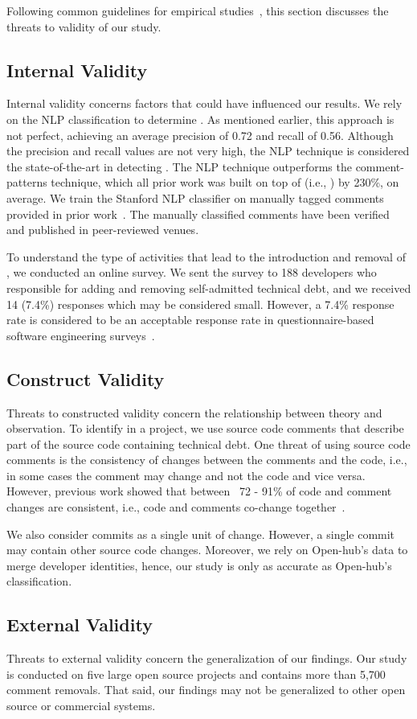 Following common guidelines for empirical studies~\cite{yin2013case},  this section discusses the threats to validity of our study.

\subsection{Internal Validity} Internal validity concerns factors that could
have influenced our results. We rely on the NLP classification to determine \SATD. As mentioned earlier, this approach is not perfect, achieving an average precision of 0.72 and recall of 0.56. Although the precision and recall values are not very high, the NLP technique is considered the state-of-the-art in detecting \SATD. The NLP technique outperforms the comment-patterns technique, which all prior work was built on top of (i.e., \cite{Wehaibi2016SANER,Bavota2016MSR,Potdar2014ICSME}) by 230\%, on average. We train the Stanford NLP classifier on manually tagged \SATD comments provided in prior work~\cite{Maldonado2015TSE}. The manually classified comments have been verified and published in peer-reviewed venues.

To understand the type of activities that lead to the introduction and removal of \SATD, we conducted an online survey. We sent the survey to 188 developers who responsible for adding and removing self-admitted technical debt, and we received 14 (7.4\%) responses which may be considered small. However, a 7.4\% response rate is considered to be an acceptable response rate in questionnaire-based software engineering surveys~\cite{singer2008software}.

\subsection{Construct Validity} Threats to constructed validity concern the relationship between theory and observation.
To identify \SATD in a project, we use source code comments that describe part of the source code containing technical debt. One threat of using source code comments is the consistency of changes between the comments and the code, i.e., in some cases the comment may change and not the code and vice versa. However, previous work showed that between ~72 - 91\% of code and comment changes are consistent, i.e., code and comments co-change together~\cite{Potdar2014ICSME}. 


 We also consider commits as a single unit of change. However, a single commit may contain other source code changes. Moreover, we rely on Open-hub's data to merge developer identities, hence, our study is only as accurate as Open-hub's classification.

\subsection{External Validity} Threats to external validity concern the generalization of our findings. Our study is conducted on five large open source projects and contains more than 5,700 comment removals. That said, our findings may not be generalized to other open source or commercial systems.